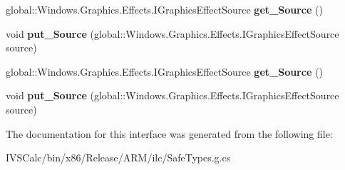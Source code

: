 \begin{DoxyCompactItemize}
\item 
\mbox{\label{interface_microsoft_1_1_graphics_1_1_canvas_1_1_effects_1_1_i_invert_effect_a2adc52ee21ca538da6e97ba19558690f}} 
global\+::\+Windows.\+Graphics.\+Effects.\+I\+Graphics\+Effect\+Source {\bfseries get\+\_\+\+Source} ()
\item 
\mbox{\label{interface_microsoft_1_1_graphics_1_1_canvas_1_1_effects_1_1_i_invert_effect_aa092eefd8f15e6bf82ca0bd15e45340e}} 
void {\bfseries put\+\_\+\+Source} (global\+::\+Windows.\+Graphics.\+Effects.\+I\+Graphics\+Effect\+Source source)
\item 
\mbox{\label{interface_microsoft_1_1_graphics_1_1_canvas_1_1_effects_1_1_i_invert_effect_a2adc52ee21ca538da6e97ba19558690f}} 
global\+::\+Windows.\+Graphics.\+Effects.\+I\+Graphics\+Effect\+Source {\bfseries get\+\_\+\+Source} ()
\item 
\mbox{\label{interface_microsoft_1_1_graphics_1_1_canvas_1_1_effects_1_1_i_invert_effect_aa092eefd8f15e6bf82ca0bd15e45340e}} 
void {\bfseries put\+\_\+\+Source} (global\+::\+Windows.\+Graphics.\+Effects.\+I\+Graphics\+Effect\+Source source)
\end{DoxyCompactItemize}


The documentation for this interface was generated from the following file\+:\begin{DoxyCompactItemize}
\item 
I\+V\+S\+Calc/bin/x86/\+Release/\+A\+R\+M/ilc/Safe\+Types.\+g.\+cs\end{DoxyCompactItemize}
